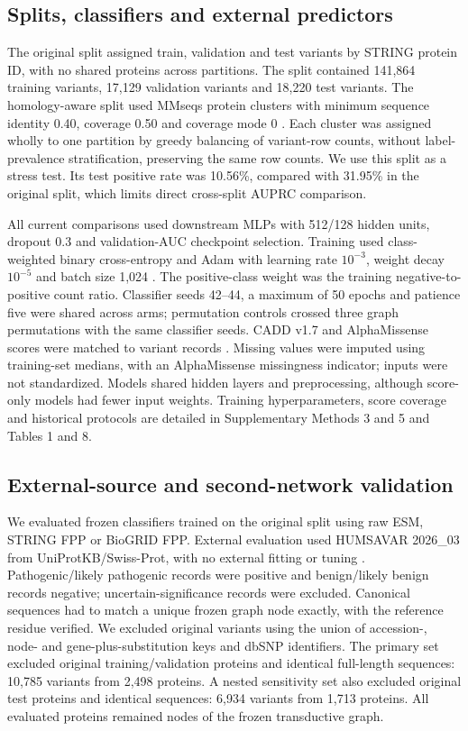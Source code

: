 \documentclass[conference]{IEEEtran}
\begin{document}
\subsection{Splits, classifiers and external predictors}

The original split assigned train, validation and test variants by STRING protein ID, with no shared proteins across partitions. The split contained 141,864 training variants, 17,129 validation variants and 18,220 test variants. The homology-aware split used MMseqs protein clusters with minimum sequence identity 0.40, coverage 0.50 and coverage mode 0 \cite{Steinegger2017MMseqs2}. Each cluster was assigned wholly to one partition by greedy balancing of variant-row counts, without label-prevalence stratification, preserving the same row counts. We use this split as a stress test. Its test positive rate was 10.56\%, compared with 31.95\% in the original split, which limits direct cross-split AUPRC comparison.

All current comparisons used downstream MLPs with 512/128 hidden units, dropout 0.3 and validation-AUC checkpoint selection. Training used class-weighted binary cross-entropy and Adam with learning rate $10^{-3}$, weight decay $10^{-5}$ and batch size 1,024 \cite{Kingma2015Adam}. The positive-class weight was the training negative-to-positive count ratio. Classifier seeds 42--44, a maximum of 50 epochs and patience five were shared across arms; permutation controls crossed three graph permutations with the same classifier seeds. CADD v1.7 and AlphaMissense scores were matched to variant records \cite{Schubach2024CADDv17,Cheng2023AlphaMissense}. Missing values were imputed using training-set medians, with an AlphaMissense missingness indicator; inputs were not standardized. Models shared hidden layers and preprocessing, although score-only models had fewer input weights. Training hyperparameters, score coverage and historical protocols are detailed in Supplementary Methods 3 and 5 and Tables 1 and 8.

\subsection{External-source and second-network validation}

We evaluated frozen classifiers trained on the original split using raw ESM, STRING FPP or BioGRID FPP. External evaluation used HUMSAVAR 2026\_03 from UniProtKB/\allowbreak{}Swiss-Prot, with no external fitting or tuning \cite{UniProt2025}. Pathogenic/likely pathogenic records were positive and benign/likely benign records negative; uncertain-significance records were excluded. Canonical sequences had to match a unique frozen graph node exactly, with the reference residue verified. We excluded original variants using the union of accession-, node- and gene-plus-substitution keys and dbSNP identifiers. The primary set excluded original training/validation proteins and identical full-length sequences: 10,785 variants from 2,498 proteins. A nested sensitivity set also excluded original test proteins and identical sequences: 6,934 variants from 1,713 proteins. All evaluated proteins remained nodes of the frozen transductive graph.
\end{document}

